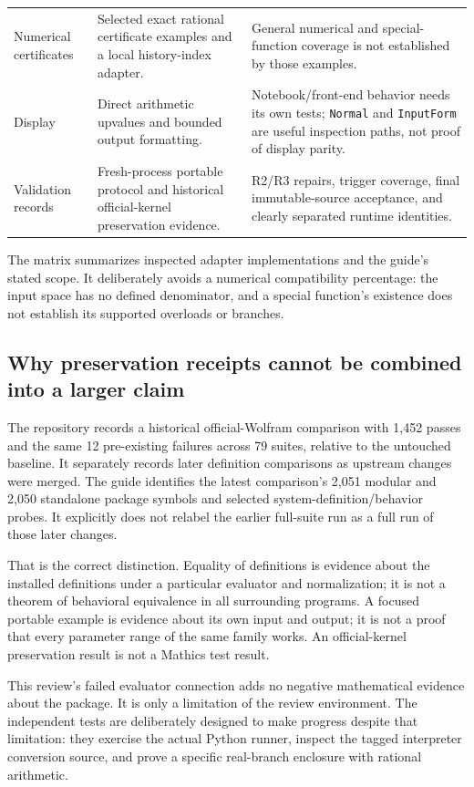 \documentclass[11pt,a4paper]{article}
\newcommand{\code}[1]{\texttt{#1}}
\begin{document}
\begin{longtable}{@{}L{0.21\textwidth}L{0.34\textwidth}L{0.355\textwidth}@{}}
Numerical certificates & Selected exact rational certificate examples and a local history-index adapter. & General numerical and special-function coverage is not established by those examples.\\
Display & Direct arithmetic upvalues and bounded output formatting. & Notebook/front-end behavior needs its own tests; \code{Normal} and \code{InputForm} are useful inspection paths, not proof of display parity.\\
Validation records & Fresh-process portable protocol and historical official-kernel preservation evidence. & R2/R3 repairs, trigger coverage, final immutable-source acceptance, and clearly separated runtime identities.\\
\bottomrule
\end{longtable}
The matrix summarizes inspected adapter implementations and the guide's stated scope. It deliberately avoids a numerical compatibility percentage: the input space has no defined denominator, and a special function's existence does not establish its supported overloads or branches.\cite{mathicsguide,compat,algebra,simplification,corefunctions}

\subsection{Why preservation receipts cannot be combined into a larger claim}
The repository records a historical official-Wolfram comparison with 1,452 passes and the same 12 pre-existing failures across 79 suites, relative to the untouched baseline. It separately records later definition comparisons as upstream changes were merged. The guide identifies the latest comparison's 2,051 modular and 2,050 standalone package symbols and selected system-definition/behavior probes. It explicitly does not relabel the earlier full-suite run as a full run of those later changes.\cite{mathicsguide,preservation}

That is the correct distinction. Equality of definitions is evidence about the installed definitions under a particular evaluator and normalization; it is not a theorem of behavioral equivalence in all surrounding programs. A focused portable example is evidence about its own input and output; it is not a proof that every parameter range of the same family works. An official-kernel preservation result is not a Mathics test result.

This review's failed evaluator connection adds no negative mathematical evidence about the package. It is only a limitation of the review environment. The independent tests are deliberately designed to make progress despite that limitation: they exercise the actual Python runner, inspect the tagged interpreter conversion source, and prove a specific real-branch enclosure with rational arithmetic.
\end{document}
